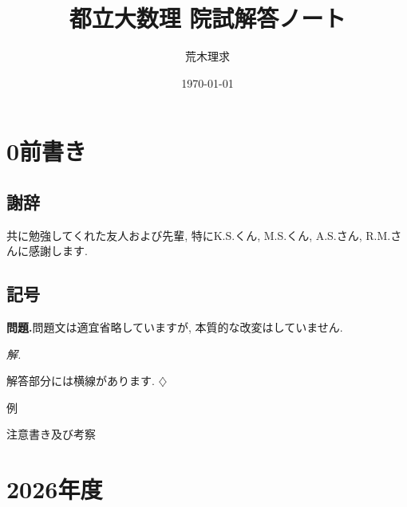 \documentclass[titlepage]{jsarticle}
\title{都立大数理 院試解答ノート}
\author{荒木理求}
\date \today
\numberwithin{equation}{section}
\newenvironment{kaitou}[1][解]{%
\begin{proofbox}%
\textit{#1. }\ignorespaces
}{%
\hfill$\diamondsuit$%
\end{proofbox}%
}
\begin{document}
\maketitle
\setcounter{section}{0}
\setcounter{subsection}{0}
\section*{0\hspace{0.7em}前書き}
\subsection*{\thesubsection\hspace{0.7em}謝辞}
共に勉強してくれた友人および先輩, 特にK.S.くん, M.S.くん, A.S.さん, R.M.さんに感謝します. 
\subsection*{\thesubsection\hspace{0.7em}記号}
\begin{problem}
\textbf{問題.}\quad 問題文は適宜省略していますが, 本質的な改変はしていません.
\end{problem}
\begin{kaitou}
解答部分には横線があります. 
\end{kaitou}
\begin{dfn}{}{}
\end{dfn}
\begin{thm}{}{}
\end{thm}
\begin{ex}{例}
\end{ex}
\begin{marker}
注意書き及び考察
\end{marker}

\newpage
\tableofcontents
\newpage
\section{2026年度}
\end{document}
